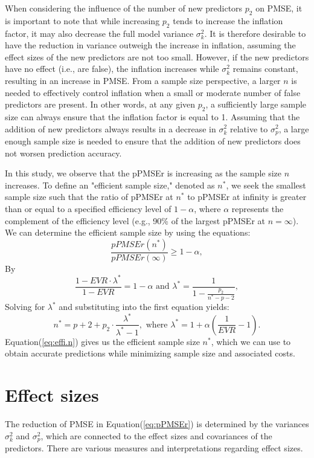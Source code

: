 When considering the influence of the number of new predictors $p_2$ on PMSE, it is important to note that while increasing $p_2$ tends to increase the inflation factor, it may also decrease the full model variance $\sigma_k^2$. It is therefore desirable to have the reduction in variance outweigh the increase in inflation, assuming the effect sizes of the new predictors are not too small. However, if the new predictors have no effect (i.e., are false), the inflation increases while $\sigma_k^2$ remains constant, resulting in an increase in PMSE. From a sample size perspective, a larger $n$ is needed to effectively control inflation when a small or moderate number of false predictors are present. In other words, at any given $p_2$, a sufficiently large sample size can always ensure that the inflation factor is equal to 1. Assuming that the addition of new predictors always results in a decrease in $\sigma_k^2$ relative to $\sigma_p^2$, a large enough sample size is needed to ensure that the addition of new predictors does not worsen prediction accuracy.

In this study, we observe that the pPMSEr is increasing as the sample size $n$ increases. To define an "efficient sample size," denoted as $n^*$, we seek the smallest sample size such that the ratio of pPMSEr at $n^*$ to pPMSEr at infinity is greater than or equal to a specified efficiency level of $1-\alpha$, where $\alpha$ represents the complement of the efficiency level (e.g., 90\% of the largest pPMSEr at $n=\infty$).
We can determine the efficient sample size by using the equations:
$$
\frac{pPMSEr(n^*)}{pPMSEr(\infty)} \geq 1-\alpha, 
$$
By 
$$
\frac{1 - EVR\cdot \lambda^*}{1 - EVR} = 1- \alpha 
\text{ and } 
\lambda^*=\frac{1}{1 - \frac{p_2}{n^*-p-2}},
$$
Solving for $\lambda^*$ and substituting into the first equation yields:\begin{equation}
\label{eq:effi.n}
n^* = p+2 + p_2 \cdot \frac{\lambda^*}{\lambda^*-1}, \text{ where } 
\lambda^*= 1+ \alpha(\frac{1}{EVR} - 1 ). 
\end{equation}
Equation(\ref{eq:effi.n}) gives us the efficient sample size $n^*$, which we can use to obtain accurate predictions while minimizing sample size and associated costs.

\section{Effect sizes}

The reduction of PMSE in Equation(\ref{eq:pPMSEr}) is determined by the variances $\sigma_k^2$ and $\sigma_p^2$, which are connected to the effect sizes and covariances of the predictors. There are various measures and interpretations regarding effect sizes.

